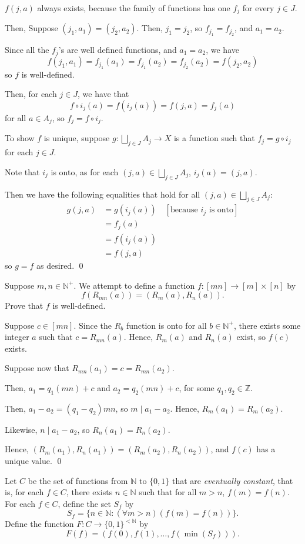 \documentclass[a4paper, 11pt]{exam}
\newcommand{\solbox}[1]{\begin{EnvFullwidth}\begin{solution}#1\end{solution}\end{EnvFullwidth}}
\begin{document}
\begin{questions}
{\(f(j,a)\) always exists, because the family of functions has one \(f_j\) for every \(j\in J\).

Then, Suppose \((j_1,a_1)=(j_2,a_2)\). Then, \(j_1=j_2\), so \(f_{j_1}=f_{j_2}\), and \(a_1=a_2\).

Since all the \(f_j\)'s are well defined functions, and \(a_1=a_2\), we have
\[f(j_1,a_1)=f_{j_1}(a_1)=f_{j_1}(a_2)=f_{j_2}(a_2)=f(j_2,a_2)\]
so \(f\) is well-defined.

Then, for each \(j\in J\), we have that
\[f\circ i_j(a)=f(i_j(a))=f(j,a)=f_j(a)\]
for all \(a\in A_j\), so \(f_j=f\circ i_j\).

To show \(f\) is unique, suppose \(g:\bigsqcup_{j\in J}A_j\to X\) is a function such that \(f_j=g\circ i_j\) for each \(j\in J\).

Note that \(i_j\) is onto, as for each \((j,a)\in \bigsqcup_{j\in J}A_j\), \(i_j(a)=(j,a)\).

Then we have the following equalities that hold for all \((j,a)\in\bigsqcup_{j\in J}A_j\):
\begin{align*}
    g(j,a)&=g(i_j(a))\quad[\text{because } i_j\text{ is onto}]\\
    &=f_j(a)\\
    &=f(i_j(a))\\
    &=f(j,a)
\end{align*}
so \(g=f\) as desired. \qed
}
\clearpage
\question[3] Suppose \(m,n\in\mathbb{N}^+\). We attempt to define a function \(f:[mn]\to[m]\times[n]\) by
\[f(R_{mn}(a))=(R_m(a),R_n(a)).\]
Prove that \(f\) is well-defined.
\solbox{
Suppose \(c\in[mn]\). Since the \(R_b\) function is onto for all \(b\in\mathbb{N}^+\), there exists some integer \(a\) such that \(c=R_{mn}(a)\). Hence, \(R_m(a)\) and \(R_n(a)\) exist, so \(f(c)\) exists.

Suppose now that \(R_{mn}(a_1)=c=R_{mn}(a_2)\).

Then, \(a_1=q_1(mn)+c\) and \(a_2=q_2(mn)+c\), for some \(q_1,q_2\in\mathbb{Z}\).

Then, \(a_1-a_2=(q_1-q_2)mn\), so \(m\mid a_1-a_2\). Hence, \(R_m(a_1)=R_m(a_2)\).

Likewise, \(n\mid a_1-a_2\), so \(R_n(a_1)=R_n(a_2)\).

Hence, \((R_m(a_1),R_n(a_1))=(R_m(a_2),R_n(a_2))\), and \(f(c)\) has a unique value. \qed
}
\clearpage 
\question Let \(C\) be the set of functions from \(\mathbb{N}\) to \(\{0,1\}\) that are \textit{eventually constant}, that is, for each \(f\in C\), there exists \(n\in\mathbb{N}\) such that for all \(m>n\), \(f(m)=f(n)\). For each \(f\in C\), define the set \(S_f\) by
\[S_f=\{n\in\mathbb{N}:(\forall m>n)(f(m)=f(n))\}.\]
Define the function \(F:C\to\{0,1\}^{<\mathbb{N}}\) by
\[F(f)=(f(0),f(1),\dots,f(\min(S_f))).\]
\begin{parts}

\end{parts}
\end{questions}
\end{document}
